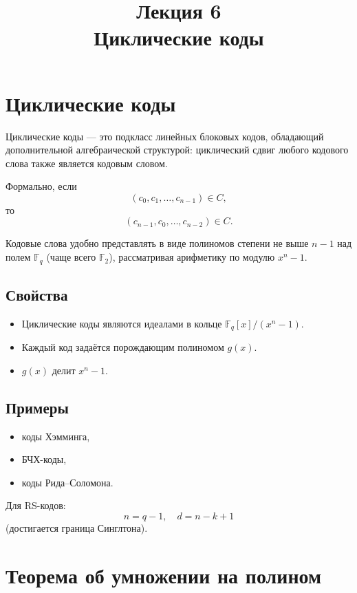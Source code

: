 \documentclass[a4paper,12pt]{article}
\title{Лекция 6 \\ Циклические коды}
\author{}
\date{}
\begin{document}
\maketitle

\section{Циклические коды}

Циклические коды --- это подкласс линейных блоковых кодов, обладающий
дополнительной алгебраической структурой: циклический сдвиг любого
кодового слова также является кодовым словом.

Формально, если
\[
(c_0, c_1, \dots, c_{n-1}) \in C,
\]
то
\[
(c_{n-1}, c_0, \dots, c_{n-2}) \in C.
\]

Кодовые слова удобно представлять в виде полиномов степени не выше $n-1$
над полем $\mathbb{F}_q$ (чаще всего $\mathbb{F}_2$), рассматривая арифметику
по модулю $x^n - 1$.

\subsection{Свойства}

\begin{itemize}
    \item Циклические коды являются идеалами в кольце $\mathbb{F}_q[x]/(x^n - 1)$.
    \item Каждый код задаётся порождающим полиномом $g(x)$.
    \item $g(x)$ делит $x^n - 1$.
\end{itemize}

\subsection{Примеры}

\begin{itemize}
    \item коды Хэмминга,
    \item БЧХ-коды,
    \item коды Рида--Соломона.
\end{itemize}

Для RS-кодов:
\[
n = q - 1, \quad d = n - k + 1
\]
(достигается граница Синглтона).

\section{Теорема об умножении на полином}
\end{document}
